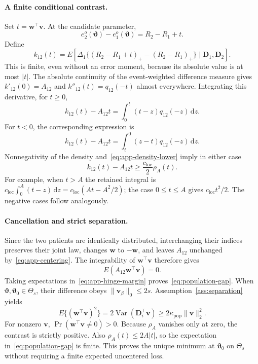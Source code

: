 \paragraph{A finite conditional contrast.}
Set $t=\bm{w}^\top \bm{v}$. At the candidate parameter,
\[
 e_2^o(\bm{\vartheta})-e_1^o(\bm{\vartheta})=R_2-R_1+t.
\]
Define
\[
 k_{12}(t)=E\!\left[\Delta_1
       \{(R_2-R_1+t)_+-(R_2-R_1)_+\}\mid \bm{D}_1,\bm{D}_2\right].
\]
This is finite, even without an error moment, because its absolute value is at most $|t|$. The absolute continuity of the event-weighted difference measure gives $k'_{12}(0)=A_{12}$ and $k''_{12}(t)=q_{12}(-t)$ almost everywhere. Integrating this derivative, for $t\ge0$,
\[
 k_{12}(t)-A_{12}t=\int_0^t(t-z)q_{12}(-z)\,\mathrm{d}z.
\]
For $t<0$, the corresponding expression is
\[
 k_{12}(t)-A_{12}t=\int_t^0(z-t)q_{12}(-z)\,\mathrm{d}z.
\]
Nonnegativity of the density and~\eqref{eq:app-density-lower} imply in either case
\begin{equation}
 k_{12}(t)-A_{12}t\ge\frac{c_{\mathrm{loc}}}{2}\rho_A(t).
 \label{eq:app-hinge-margin}
\end{equation}
For example, when $t>A$ the retained integral is
$c_{\mathrm{loc}}\int_0^A(t-z)\,\mathrm{d}z
 =c_{\mathrm{loc}}(At-A^2/2)$; the case $0\le t\le A$ gives $c_{\mathrm{loc}}t^2/2$. The negative cases follow analogously.

\paragraph{Cancellation and strict separation.}
Since the two patients are identically distributed, interchanging their indices preserves their joint law, changes $\bm{w}$ to $-\bm{w}$, and leaves $A_{12}$ unchanged by~\eqref{eq:app-centering}. The integrability of $\bm{w}^\top \bm{v}$ therefore gives
\[
 E(A_{12}\bm{w}^\top \bm{v})=0.
\]
Taking expectations in~\eqref{eq:app-hinge-margin} proves~\eqref{eq:population-gap}. When $\bm{\vartheta},\bm{\vartheta}_0\in\Theta_s$, their difference obeys $\|\bm{v}_\beta\|_0\le2s$. Assumption~\ref{ass:separation} yields
\[
 E\{(\bm{w}^\top \bm{v})^2\}=2\operatorname{Var}(\bm{D}_i^\top \bm{v})
 \ge2\kappa_{\mathrm{pop}}\|\bm{v}\|_2^2.
\]
For nonzero $\bm{v}$, $\Pr(\bm{w}^\top \bm{v}\ne0)>0$. Because $\rho_A$ vanishes only at zero, the contrast is strictly positive. Also $\rho_A(t)\le 2A|t|$, so the expectation in~\eqref{eq:population-gap} is finite. This proves the unique minimum at $\bm{\vartheta}_0$ on $\Theta_s$ without requiring a finite expected uncentered loss.

